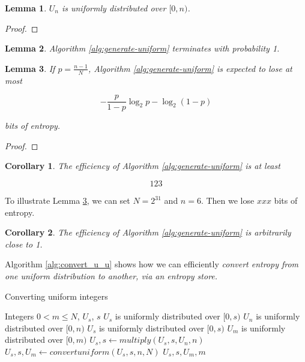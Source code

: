 \documentclass[12pt]{article}
\newtheorem{lemma}{Lemma}
\newtheorem{corollary}{Corollary}
\begin{document}
\begin{lemma}
$U_n$ is uniformly distributed over $[0,n)$.
\end{lemma}

\begin{proof}
\end{proof}

\begin{lemma}
Algorithm \ref{alg:generate-uniform} terminates with probability 1.
\end{lemma}

\begin{lemma}
    \label{lem:efficiencybinu}
If $p = \frac{n-1}{N}$, Algorithm \ref{alg:generate-uniform} is expected to lose at most

\begin{equation}
-\frac{p}{1-p}\log_2p - \log_2(1-p)
\end{equation}

bits of entropy.

\end{lemma}

\begin{proof}

\end{proof}

\begin{corollary}
The efficiency of Algorithm \ref{alg:generate-uniform} is at least

\begin{equation}
123
\end{equation}
\end{corollary}

To illustrate Lemma \ref{lem:efficiencybinu}, we can set $N=2^{31}$ and $n=6$. Then we lose $xxx$ bits of entropy.

\begin{corollary}
The efficiency of Algorithm \ref{alg:generate-uniform} is arbitrarily close to 1.
\end{corollary}

Algorithm \ref{alg:convert_u_u} shows how we can efficiently \em convert \em entropy from one uniform distribution to another, via an entropy store.

\begin{algorithm}
\caption{Converting uniform integers}
\label{alg:convert_u_u}
\begin{algorithmic}[1]
    \Require Integers $0 < m \le N$, $U_s$, $s$
    \Require $U_s$ is uniformly distributed over $[0,s)$
    \Require $U_n$ is uniformly distributed over $[0,n)$
    \Ensure  $U_s$ is uniformly distributed over $[0,s)$
    \Ensure  $U_m$ is uniformly distributed over $[0,m)$
    \State $U_s, s \gets multiply(U_s, s, U_n, n)$
    \State $U_s, s, U_m \gets convertuniform(U_s, s, n, N)$
    \State \Return $U_s, s, U_m, m$
\EndProcedure
\end{algorithmic}
\end{algorithm}
\end{document}
